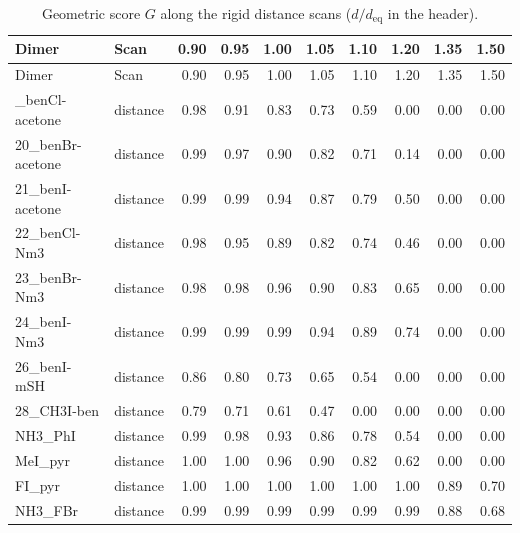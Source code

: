 {\scriptsize
\setlength{\tabcolsep}{3pt}
\begin{longtable}{llrrrrrrrr}
\caption{Geometric score $G$ along the rigid distance scans ($d/d_\mathrm{eq}$ in the header).}\label{tab:scand}\\
\toprule
Dimer & Scan & 0.90 & 0.95 & 1.00 & 1.05 & 1.10 & 1.20 & 1.35 & 1.50\\
\midrule
\endfirsthead
\toprule
Dimer & Scan & 0.90 & 0.95 & 1.00 & 1.05 & 1.10 & 1.20 & 1.35 & 1.50\\
\midrule
\endhead
\bottomrule
\endlastfoot
19\_benCl-acetone & distance & 0.98 & 0.91 & 0.83 & 0.73 & 0.59 & 0.00 & 0.00 & 0.00\\
20\_benBr-acetone & distance & 0.99 & 0.97 & 0.90 & 0.82 & 0.71 & 0.14 & 0.00 & 0.00\\
21\_benI-acetone & distance & 0.99 & 0.99 & 0.94 & 0.87 & 0.79 & 0.50 & 0.00 & 0.00\\
22\_benCl-Nm3 & distance & 0.98 & 0.95 & 0.89 & 0.82 & 0.74 & 0.46 & 0.00 & 0.00\\
23\_benBr-Nm3 & distance & 0.98 & 0.98 & 0.96 & 0.90 & 0.83 & 0.65 & 0.00 & 0.00\\
24\_benI-Nm3 & distance & 0.99 & 0.99 & 0.99 & 0.94 & 0.89 & 0.74 & 0.00 & 0.00\\
26\_benI-mSH & distance & 0.86 & 0.80 & 0.73 & 0.65 & 0.54 & 0.00 & 0.00 & 0.00\\
28\_CH3I-ben & distance & 0.79 & 0.71 & 0.61 & 0.47 & 0.00 & 0.00 & 0.00 & 0.00\\
NH3\_PhI & distance & 0.99 & 0.98 & 0.93 & 0.86 & 0.78 & 0.54 & 0.00 & 0.00\\
MeI\_pyr & distance & 1.00 & 1.00 & 0.96 & 0.90 & 0.82 & 0.62 & 0.00 & 0.00\\
FI\_pyr & distance & 1.00 & 1.00 & 1.00 & 1.00 & 1.00 & 1.00 & 0.89 & 0.70\\
NH3\_FBr & distance & 0.99 & 0.99 & 0.99 & 0.99 & 0.99 & 0.99 & 0.88 & 0.68\\
\end{longtable}}
